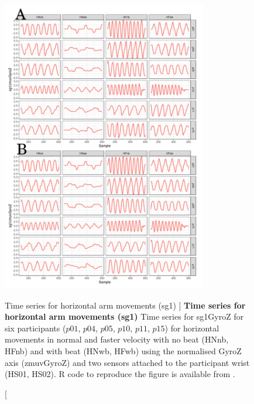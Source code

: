 \begin{figure}
\centering
\includegraphics[width=0.8\textwidth]{tssg1gyroZ}
    	\caption
	[Time series for horizontal arm movements (sg1) ]{
	{\bf Time series for horizontal arm movements (sg1)}
		Time series for sg1GyroZ for six participants 
		($p01$, $p04$, $p05$, $p10$, $p11$, $p15$) 
		for horizontal movements in normal and faster velocity with
		no beat	(HNnb, HFnb) and with beat (HNwb, HFwb) using 
		the normalised GyroZ axis (zmuvGyroZ) and 
		two sensors attached to the participant wrist (HS01, HS02).
	R code to reproduce the figure is available from \cite{xochicale2018}.
        }
    \label{fig:tssg1gyroZ-hii}
\end{figure}


